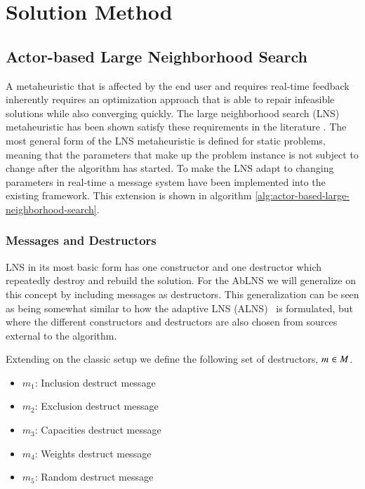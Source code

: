 \section{Solution Method}
\label{sec:2-solution-method}

\subsection{Actor-based Large Neighborhood Search}
A metaheuristic that is affected by the end user and requires real-time feedback
inherently requires an optimization approach that is able to repair infeasible solutions
while also converging quickly. The large neighborhood search (LNS)~\cite{shaw1998using}
metaheuristic has been shown satisfy these requirements in the literature
\cite{gendreauHandbookMetaheuristics2019}. The most general form of the LNS metaheuristic
is defined for static problems, meaning that the parameters that make up the problem instance
is not subject to change after the algorithm has started. To make the
LNS adapt to changing parameters in real-time a message system have been
implemented into the existing framework. This  extension is shown in algorithm
\ref{alg:actor-based-large-neighborhood-search}.

\subsubsection{Messages and Destructors}
LNS in its most basic form has one constructor and one destructor which
repeatedly destroy and rebuild the solution. For the AbLNS we will generalize
on this concept by including messages as destructors. This generalization can
be seen as being somewhat similar to how
the adaptive LNS (ALNS)~\cite{pisinger2007general} is formulated, but where the different constructors and
destructors are also chosen from sources external to the algorithm.

Extending on the classic setup we define the following set of destructors, $m_{}^{} \in M$.
\begin{itemize}
	\item $m_1$: Inclusion destruct message	
	\item $m_2$: Exclusion destruct message	
	\item $m_3$: Capacities destruct message	
	\item $m_4$: Weights destruct message	
	\item $m_5$: Random destruct message
\end{itemize}

